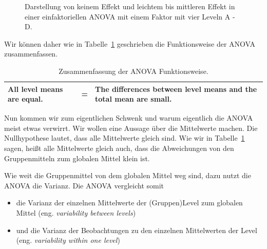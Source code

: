 \documentclass[
  letterpaper,
]{scrbook}
\providecommand{\tightlist}{%
  \setlength{\itemsep}{0pt}\setlength{\parskip}{0pt}}\usepackage{longtable,booktabs,array}
\begin{document}
\begin{figure}
\begin{minipage}[t]{0.50\linewidth}
{{}

}

\end{minipage}%

\caption{\label{fig-anova-exp-6}Darstellung von keinem Effekt und
leichtem bis mittleren Effekt in einer einfaktoriellen ANOVA mit einem
Faktor mit vier Leveln A - D.}

\end{figure}

Wir können daher wie in Tabelle~\ref{tbl-sum-anova-eff} geschrieben die
Funktionsweise der ANOVA zusammenfassen.

\hypertarget{tbl-sum-anova-eff}{}
\begin{longtable}[]{@{}
  >{\centering\arraybackslash}p{}
  >{\centering\arraybackslash}p{}
  >{\centering\arraybackslash}p{}@{}}
\caption{\label{tbl-sum-anova-eff}Zusammenfassung der ANOVA
Funktionsweise.}\tabularnewline
\toprule()
\endhead
All level means are equal. & = & The differences between level means and
the total mean are small. \\
\bottomrule()
\end{longtable}

Nun kommen wir zum eigentlichen Schwenk und warum eigentlich die ANOVA
meist etwas verwirrt. Wir wollen eine Aussage über die Mittelwerte
machen. Die Nullhypothese lautet, dass alle Mittelwerte gleich sind. Wie
wir in Tabelle~\ref{tbl-sum-anova-eff} sagen, heißt alle Mittelwerte
gleich auch, dass die Abweichungen von den Gruppenmitteln zum globalen
Mittel klein ist.

Wie weit die Gruppenmittel von dem globalen Mittel weg sind, dazu nutzt
die ANOVA die Varianz. Die ANOVA vergleicht somit

\begin{itemize}
\tightlist
\item
  die Varianz der einzelnen Mittelwerte der (Gruppen)Level zum globalen
  Mittel (eng. \emph{variability between levels})
\item
  und die Varianz der Beobachtungen zu den einzelnen Mittelwerten der
  Level (eng. \emph{variability within one level})
\end{itemize}

{}
\end{document}
